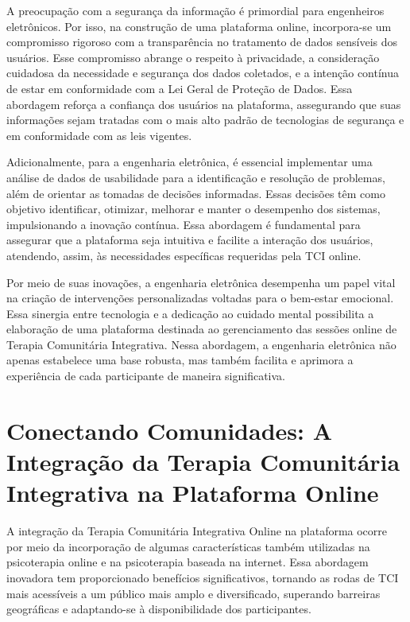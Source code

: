        A preocupação com a segurança da informação é primordial para engenheiros eletrônicos. Por isso, na construção de uma plataforma online, incorpora-se um compromisso rigoroso com a transparência no tratamento de dados sensíveis dos usuários. Esse compromisso abrange o respeito à privacidade, a consideração cuidadosa da necessidade e segurança dos dados coletados, e a intenção contínua de estar em conformidade com a Lei Geral de Proteção de Dados\cite{LGPD}. Essa abordagem reforça a confiança dos usuários na plataforma, assegurando que suas informações sejam tratadas com o mais alto padrão de tecnologias de segurança e em conformidade com as leis vigentes.
        
        Adicionalmente, para a engenharia eletrônica, é essencial implementar uma análise de dados de usabilidade para a identificação e resolução de problemas, além de orientar as tomadas de decisões informadas. Essas decisões têm como objetivo identificar, otimizar, melhorar e manter o desempenho dos sistemas, impulsionando a inovação contínua. Essa abordagem é fundamental para assegurar que a plataforma seja intuitiva e facilite a interação dos usuários, atendendo, assim, às necessidades específicas requeridas pela TCI online.
        
        Por meio de suas inovações, a engenharia eletrônica desempenha um papel vital na criação de intervenções personalizadas voltadas para o bem-estar emocional. Essa sinergia entre tecnologia e a dedicação ao cuidado mental possibilita a elaboração de uma plataforma destinada ao gerenciamento das sessões online de Terapia Comunitária Integrativa. Nessa abordagem, a engenharia eletrônica não apenas estabelece uma base robusta, mas também facilita e aprimora a experiência de cada participante de maneira significativa.
        
    \chapter{Conectando Comunidades: A Integração da Terapia Comunitária Integrativa na Plataforma Online}
    
        A integração da Terapia Comunitária Integrativa Online na plataforma ocorre por meio da incorporação de algumas características também utilizadas na psicoterapia online e na psicoterapia baseada na internet. Essa abordagem inovadora tem proporcionado benefícios significativos, tornando as rodas de TCI mais acessíveis a um público mais amplo e diversificado, superando barreiras geográficas e adaptando-se à disponibilidade dos participantes.
        
